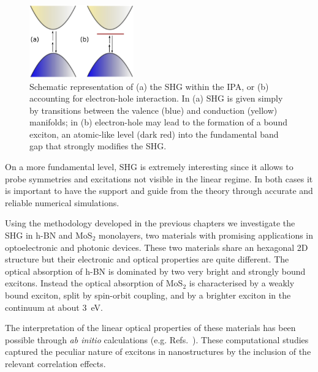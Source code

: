 \begin{figure}
    \vspace{-0.7cm}
\begin{center}
\includegraphics[width=0.4\textwidth]{Figures/exciton}
\caption{\footnotesize{Schematic representation of  (a) the SHG within the IPA, or (b) accounting for electron-hole interaction. In (a) SHG is given simply by transitions between the valence (blue) and conduction (yellow) manifolds; in (b) electron-hole may lead to the formation of a bound exciton, an atomic-like level (dark red) into the fundamental band gap that strongly modifies the SHG. \label{schemeshg}}}  
\end{center}
\end{figure}   

On a more fundamental level, SHG is extremely interesting since it allows to probe symmetries and excitations not visible in the linear regime\cite{doi:10.1021/nl401561r,kumar2013second}.   In both cases it is %
important to have the support and guide from the theory through accurate and reliable numerical simulations.



Using the methodology developed in the previous chapters we investigate the SHG in h-BN and MoS$_2$ monolayers, two materials with promising applications in optoelectronic and photonic devices. These two materials share an hexagonal 2D structure but their electronic and optical properties are quite different. The optical absorption of h-BN is dominated by two very bright and strongly bound excitons.\cite{PhysRevLett.96.126104,PhysRevLett.100.189701} Instead the optical absorption of MoS$_2$ is characterised by a weakly bound exciton, split by spin-orbit coupling,\cite{PhysRevLett.105.136805} and by a brighter exciton in the continuum at about 3~eV.\cite{molina2013effect} 

The interpretation of the linear optical properties of these materials has been possible through \emph{ab initio} calculations (e.g. Refs.~\cite{molina2013effect,PhysRevLett.100.189701}). These computational studies captured the peculiar nature of excitons in nanostructures\cite{scholes2006excitons} by the inclusion of the relevant correlation effects.


